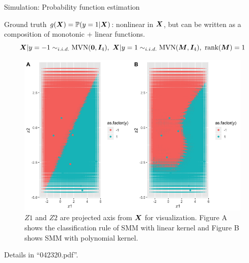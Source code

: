 \documentclass[compress,dvipsnames]{beamer}
\begin{document}
\begin{frame}{Simulation: Probability function estimation}

Ground truth $g(\bm{X})=\mathbb{P}(y=1|\bm{X})$: nonlinear in $\bm{X}$, but can be written as a composition of monotonic  + linear functions.
\[ 
\bm{X}|y=-1 \sim_{i.i.d.} \text{MVN}(\mathbf{0},\bm{I}_4), \ \bm{X}|y=1\sim_{i.i.d.} \text{MVN}(\bm{M}, \bm{I}_4),\ \text{rank}(\bm{M})=1
\]

\begin{figure}[H]
\centering
\includegraphics[width=.5\textwidth]{SMMK3.png}
\caption{\small $Z1$ and $Z2$ are projected axis from $\bm{X}$ for visualization. Figure A shows the classification rule of SMM with linear kernel and Figure B shows SMM with polynomial kernel.}
\end{figure}
\vspace{-.5cm}


{\scriptsize Details in ``042320.pdf''.}
\end{frame}
\end{document}
